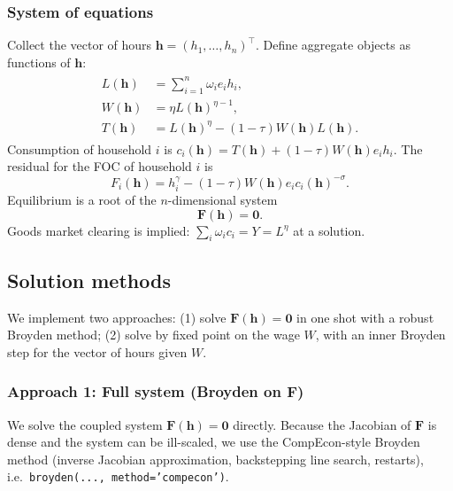 \subsubsection{System of equations}

Collect the vector of hours $\mathbf{h} = (h_1,\ldots,h_n)^\top$. Define aggregate objects as functions of $\mathbf{h}$:
\begin{align}
\begin{split}
  L(\mathbf{h}) &= \sum_{i=1}^n \omega_i e_i h_i, \\
  W(\mathbf{h}) &= \eta L(\mathbf{h})^{\eta-1}, \\
  T(\mathbf{h}) &= L(\mathbf{h})^\eta - (1-\tau) W(\mathbf{h}) L(\mathbf{h}).
\end{split}
\end{align}
Consumption of household $i$ is $c_i(\mathbf{h}) = T(\mathbf{h}) + (1-\tau) W(\mathbf{h}) e_i h_i$. The residual for the FOC of household $i$ is
\begin{equation}
  F_i(\mathbf{h}) = h_i^\gamma - (1-\tau) W(\mathbf{h}) e_i c_i(\mathbf{h})^{-\sigma}.
\end{equation}
Equilibrium is a root of the $n$-dimensional system
\begin{equation}
  \mathbf{F}(\mathbf{h}) = \mathbf{0}.
\end{equation}
Goods market clearing is implied: $\sum_i \omega_i c_i = Y = L^\eta$ at a solution.

\subsection{Solution methods}

We implement two approaches: (1) solve $\mathbf{F}(\mathbf{h})=\mathbf{0}$ in one shot with a robust Broyden method; (2) solve by fixed point on the wage $W$, with an inner Broyden step for the vector of hours given $W$.

\subsubsection{Approach 1: Full system (Broyden on $\mathbf{F}$)}

We solve the coupled system $\mathbf{F}(\mathbf{h})=\mathbf{0}$ directly. Because the Jacobian of $\mathbf{F}$ is dense and the system can be ill-scaled, we use the CompEcon-style Broyden method (inverse Jacobian approximation, backstepping line search, restarts), i.e.\ \texttt{broyden(..., method='compecon')}.


